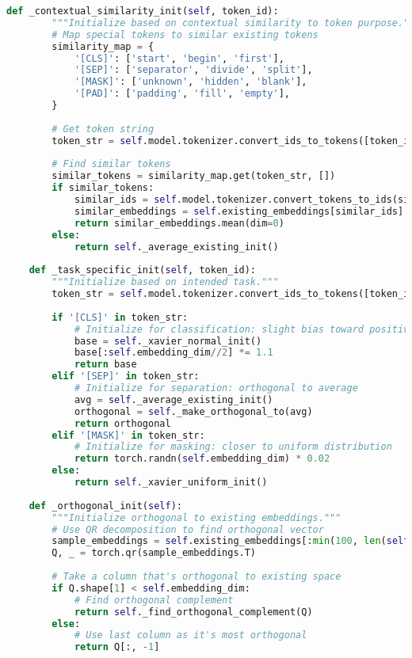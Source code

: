 \begin{lstlisting}[language=Python, caption=Advanced initialization strategies for special token embeddings]
    def _contextual_similarity_init(self, token_id):
        """Initialize based on contextual similarity to token purpose."""
        # Map special tokens to similar existing tokens
        similarity_map = {
            '[CLS]': ['start', 'begin', 'first'],
            '[SEP]': ['separator', 'divide', 'split'],
            '[MASK]': ['unknown', 'hidden', 'blank'],
            '[PAD]': ['padding', 'fill', 'empty'],
        }
        
        # Get token string
        token_str = self.model.tokenizer.convert_ids_to_tokens([token_id])[0]
        
        # Find similar tokens
        similar_tokens = similarity_map.get(token_str, [])
        if similar_tokens:
            similar_ids = self.model.tokenizer.convert_tokens_to_ids(similar_tokens)
            similar_embeddings = self.existing_embeddings[similar_ids]
            return similar_embeddings.mean(dim=0)
        else:
            return self._average_existing_init()
            
    def _task_specific_init(self, token_id):
        """Initialize based on intended task."""
        token_str = self.model.tokenizer.convert_ids_to_tokens([token_id])[0]
        
        if '[CLS]' in token_str:
            # Initialize for classification: slight bias toward positive dimensions
            base = self._xavier_normal_init()
            base[:self.embedding_dim//2] *= 1.1
            return base
        elif '[SEP]' in token_str:
            # Initialize for separation: orthogonal to average
            avg = self._average_existing_init()
            orthogonal = self._make_orthogonal_to(avg)
            return orthogonal
        elif '[MASK]' in token_str:
            # Initialize for masking: closer to uniform distribution
            return torch.randn(self.embedding_dim) * 0.02
        else:
            return self._xavier_uniform_init()
            
    def _orthogonal_init(self):
        """Initialize orthogonal to existing embeddings."""
        # Use QR decomposition to find orthogonal vector
        sample_embeddings = self.existing_embeddings[:min(100, len(self.existing_embeddings))]
        Q, _ = torch.qr(sample_embeddings.T)
        
        # Take a column that's orthogonal to existing space
        if Q.shape[1] < self.embedding_dim:
            # Find orthogonal complement
            return self._find_orthogonal_complement(Q)
        else:
            # Use last column as it's most orthogonal
            return Q[:, -1]
            

\end{lstlisting}
